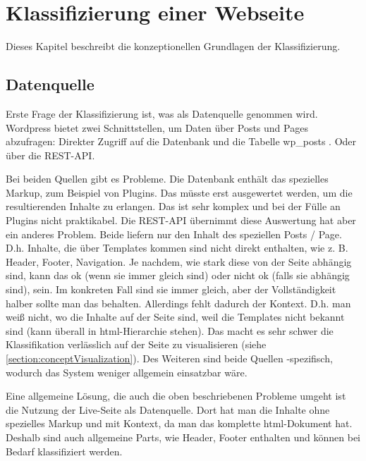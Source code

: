 \section{Klassifizierung einer Webseite}
    \label{section:conceptClassification}
    Dieses Kapitel beschreibt die konzeptionellen Grundlagen der Klassifizierung.

    \subsection{Datenquelle}
        \label{section:conceptClassificationDataSource}
        Erste Frage der Klassifizierung ist, was als Datenquelle genommen wird.
        Wordpress bietet zwei Schnittstellen, um Daten über Posts und Pages abzufragen:
        Direkter Zugriff auf die Datenbank und die Tabelle wp\_posts
        \cite{wordpress:Database}.
        Oder über die REST-API\cite{wordpress:RestAPI}.

        Bei beiden Quellen gibt es Probleme.
        Die Datenbank enthält das spezielles Markup, zum Beispiel von Plugins.
        Das müsste erst ausgewertet werden, um die resultierenden Inhalte zu erlangen.
        Das ist sehr komplex und bei der Fülle an Plugins nicht praktikabel.
        Die REST-API übernimmt diese Auswertung hat aber ein anderes Problem.
        Beide liefern nur den Inhalt des speziellen Posts / Page.
        D.h. Inhalte, die über Templates kommen sind nicht direkt enthalten,
        wie z. B. Header, Footer, Navigation.
        Je nachdem, wie stark diese von der Seite abhängig sind,
        kann das ok (wenn sie immer gleich sind) oder nicht ok (falls sie abhängig sind),
        sein. Im konkreten Fall sind sie immer gleich, aber der Vollständigkeit halber sollte man das
        behalten.
        Allerdings fehlt dadurch der Kontext. D.h. man weiß nicht, wo die Inhalte auf der Seite sind,
        weil die Templates nicht bekannt sind (kann überall in \gls{html}-Hierarchie stehen).
        Das macht es sehr schwer die Klassifikation verlässlich auf der Seite zu visualisieren
        (siehe \ref{section:conceptVisualization}).
        Des Weiteren sind beide Quellen {\wordpress}-spezifisch, wodurch das System weniger
        allgemein einsatzbar wäre.

        Eine allgemeine Lösung, die auch die oben beschriebenen Probleme umgeht ist die Nutzung
        der Live-Seite als Datenquelle.
        Dort hat man die Inhalte ohne spezielles Markup und mit Kontext, da man das komplette \gls{html}-Dokument hat.
        Deshalb sind auch allgemeine Parts, wie Header, Footer enthalten und können bei Bedarf klassifiziert werden.

